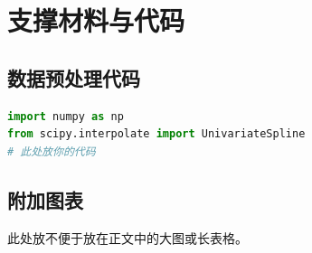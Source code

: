 
\appendix
\section{支撑材料与代码}

\subsection{数据预处理代码}
\begin{lstlisting}[language=Python, caption=样条插值提取极值点]
import numpy as np
from scipy.interpolate import UnivariateSpline
# 此处放你的代码
\end{lstlisting}

\subsection{附加图表}
此处放不便于放在正文中的大图或长表格。
